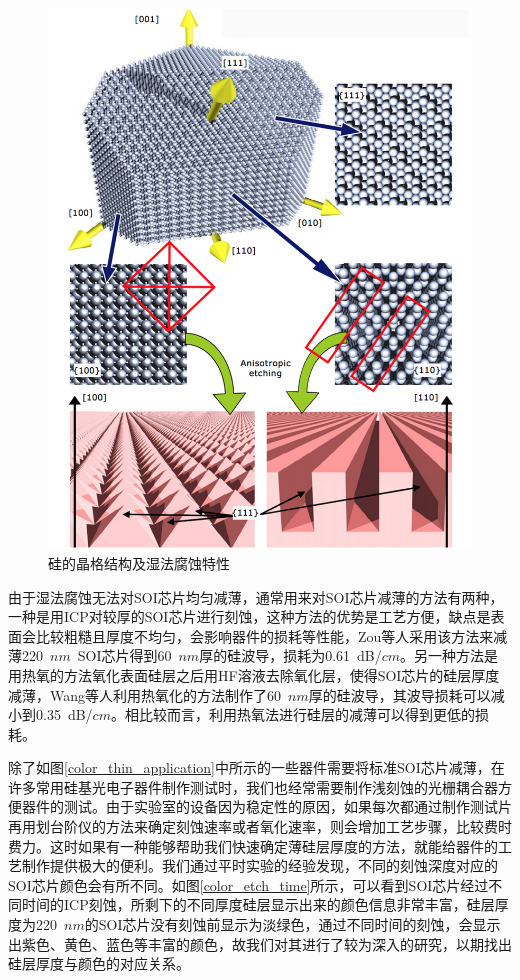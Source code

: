 \begin{figure}[htb]
	\centering
	\includegraphics[width=12cm]{./Pictures/color_silicon_crystal.jpg}
	\captionsetup{justification=centering}
	\caption{硅的晶格结构及湿法腐蚀特性\cite{microchemicals}}
	\label{color_silicon_crystal}
\end{figure}

由于湿法腐蚀无法对SOI芯片均匀减薄，通常用来对SOI芯片减薄的方法有两种，一种是用ICP对较厚的SOI芯片进行刻蚀，这种方法的优势是工艺方便，缺点是表面会比较粗糙且厚度不均匀，会影响器件的损耗等性能，Zou等人采用该方法来减薄220~$nm$~SOI芯片得到60~$nm$厚的硅波导，损耗为0.61~dB/$cm$\cite{zou201560}。另一种方法是用热氧的方法氧化表面硅层之后用HF溶液去除氧化层，使得SOI芯片的硅层厚度减薄，Wang等人利用热氧化的方法制作了60~$nm$厚的硅波导，其波导损耗可以减小到0.35~dB/$cm$\cite{wang2017continuously}。相比较而言，利用热氧法进行硅层的减薄可以得到更低的损耗。

除了如图\ref{color_thin_application}中所示的一些器件需要将标准SOI芯片减薄，在许多常用硅基光电子器件制作测试时，我们也经常需要制作浅刻蚀的光栅耦合器方便器件的测试\cite{taillaert2004compact}。由于实验室的设备因为稳定性的原因，如果每次都通过制作测试片再用划台阶仪的方法来确定刻蚀速率或者氧化速率，则会增加工艺步骤，比较费时费力。这时如果有一种能够帮助我们快速确定薄硅层厚度的方法，就能给器件的工艺制作提供极大的便利。我们通过平时实验的经验发现，不同的刻蚀深度对应的SOI芯片颜色会有所不同。如图\ref{color_etch_time}所示，可以看到SOI芯片经过不同时间的ICP刻蚀，所剩下的不同厚度硅层显示出来的颜色信息非常丰富，硅层厚度为220~$nm$的SOI芯片没有刻蚀前显示为淡绿色，通过不同时间的刻蚀，会显示出紫色、黄色、蓝色等丰富的颜色，故我们对其进行了较为深入的研究，以期找出硅层厚度与颜色的对应关系。

